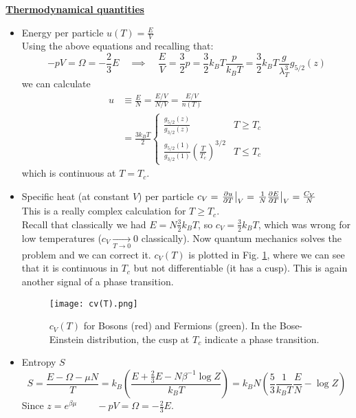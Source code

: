 \underline{\textbf{Thermodynamical quantities}}
\begin{itemize}
    \item Energy per particle $u(T) = \frac EV$\\
    Using the above equations and recalling that:
    $$-pV = \Omega = -\frac23 E \quad \implies \quad \frac EV = \frac32p = \frac32 k_BT \frac p{k_BT} = \frac32 k_BT \frac g{\lambda_T^3} g_{5/2}(z)$$
    we can calculate 
    \begin{align*}
        u &\equiv \frac EN = \frac {E/V}{N/V} = \frac{E/V}{n(T)} \\
        &= \frac{3k_BT}2 \begin{cases} 
            \frac{g_{5/2}(z)}{g_{3/2}(z)} & T \ge T_c \\ 
            \frac{g_{5/2}(1)}{g_{3/2}(1)} \left(\frac T{T_c}\right)^{3/2} & T \le T_c \end{cases}
    \end{align*}
    which is continuous at $T = T_c$.

    \item Specific heat (at constant $V$) per particle $c_V = \left.\frac{\partial u}{\partial T}\right|_V = \left.\frac1N\frac{\partial E}{\partial T}\right|_V = \frac {C_V}N$\\
    This is a really complex calculation for $T\ge T_c$.\\
    Recall that classically we had $E = N \frac32 k_BT$, so $c_V = \frac32 k_BT$, which was wrong for low temperatures ($c_V\xrightarrow[T\to 0]{}0$ classically). Now quantum mechanics solves the problem and we can correct it. $c_V(T)$ is plotted in Fig. \ref{fig:cv}, where we can see that it is continuous in $T_c$ but not differentiable (it has a cusp). This is again another signal of a phase transition.
    \begin{figure}[ht]
        \centering
        \texttt{[image: cv(T).png]}
        \caption{$c_V(T)$ for Bosons (red) and Fermions (green). In the Bose-Einstein distribution, the cusp at $T_c$ indicate a phase transition.}
        \label{fig:cv}
    \end{figure}

    \item Entropy $S$\\
    $$
        S = \frac{E-\Omega -\mu N}T = 
        k_B\left(\frac{E+\frac23 E-N\beta^{-1}\log Z}{k_BT}\right) =
        k_BN\left(\frac53\frac1{k_BT}\frac EN -\log Z\right)
    $$
    Since $z = e^{\beta\mu}\qquad -pV= \Omega = -\frac23 E$.


\end{itemize}

